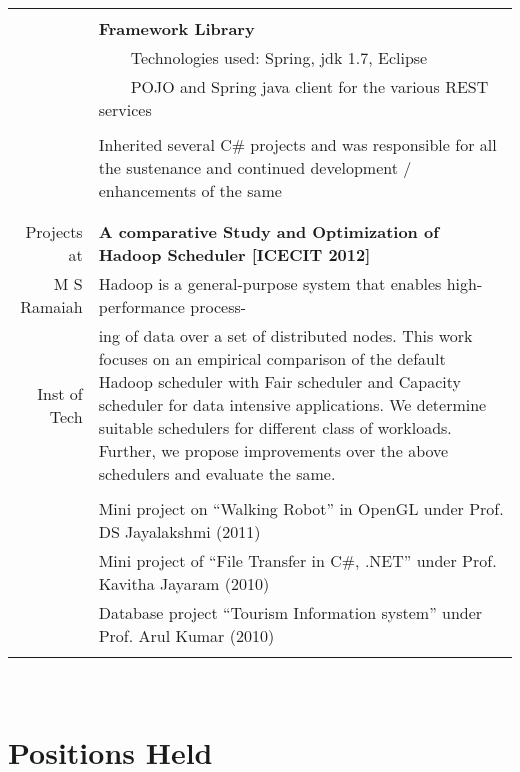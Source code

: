 \documentclass[a4paper,10pt]{article} %
\newcommand{\tabitem}{~~\llap{\textbullet}~~}
\begin{document}
\begin{tabular}{rp{13cm}}
&\\
& \textbf{Framework Library} \\
& \tabitem Technologies used: Spring, jdk 1.7, Eclipse\\
& \tabitem POJO and Spring java client for the various REST services \\ 
&\\
& Inherited several C\# projects and was responsible for all the sustenance and continued development / enhancements of the same\\
&\\
&\\
Projects at & \textbf{A comparative Study and Optimization of Hadoop Scheduler [ICECIT 2012]}\\ 
M S Ramaiah & \setlength{\leftskip}{0.4cm} Hadoop is a general-purpose system that enables high-performance process-\\
Inst of Tech & \setlength{\leftskip}{0.4cm}
ing  of data over a set of distributed nodes. This work focuses on an empirical comparison of the default Hadoop scheduler with Fair scheduler and Capacity scheduler for data intensive applications. We determine suitable schedulers for different class of workloads. Further, we propose improvements over the above schedulers and evaluate  the same.\\ 
& \\
& Mini project on “Walking Robot” in OpenGL under Prof. DS Jayalakshmi (2011)\\ 
& Mini project of “File Transfer in C\#, .NET” under Prof. Kavitha Jayaram (2010)\\
& Database project “Tourism Information system” under Prof. Arul Kumar (2010)\\
& \\
\end{tabular}
\\


\section{Positions Held}
\end{document}
